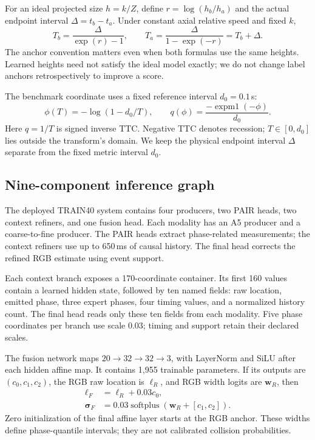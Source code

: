 \documentclass[twocolumn,letterpaper]{article}
\begin{document}
For an ideal projected size $h=k/Z$, define $r=\log(h_b/h_a)$ and the actual endpoint interval $\Delta=t_b-t_a$. Under constant axial relative speed and fixed $k$,
\begin{equation}
 T_b=\frac{\Delta}{\exp(r)-1},\qquad
 T_a=\frac{\Delta}{1-\exp(-r)}=T_b+\Delta.
\label{eq:anchors}
\end{equation}
The anchor convention matters even when both formulas use the same heights. Learned heights need not satisfy the ideal model exactly; we do not change label anchors retrospectively to improve a score.

The benchmark coordinate uses a fixed reference interval $d_0=0.1$\,s:
\begin{equation}
 \phi(T)=-\log(1-d_0/T),\qquad
 q(\phi)=\frac{-\operatorname{expm1}(-\phi)}{d_0}.
\label{eq:phase}
\end{equation}
Here $q=1/T$ is signed inverse TTC. Negative TTC denotes recession; $T\in[0,d_0]$ lies outside the transform's domain. We keep the physical endpoint interval $\Delta$ separate from the fixed metric interval $d_0$.

\subsection{Nine-component inference graph}
The deployed TRAIN40 system contains four producers, two PAIR heads, two context refiners, and one fusion head. Each modality has an A5 producer and a coarse-to-fine producer. The PAIR heads extract phase-related measurements; the context refiners use up to 650\,ms of causal history. The final head corrects the refined RGB estimate using event support.

Each context branch exposes a 170-coordinate container. Its first 160 values contain a learned hidden state, followed by ten named fields: raw location, emitted phase, three expert phases, four timing values, and a normalized history count. The final head reads only these ten fields from each modality. Five phase coordinates per branch use scale $0.03$; timing and support retain their declared scales.

The fusion network maps $20\!\rightarrow\!32\!\rightarrow\!32\!\rightarrow\!3$, with LayerNorm and SiLU after each hidden affine map. It contains 1,955 trainable parameters. If its outputs are $(c_0,c_1,c_2)$, the RGB raw location is $\ell_R$, and RGB width logits are $\mathbf w_R$, then
\begin{align}
 \ell_F&=\ell_R+0.03c_0,\\
 \boldsymbol\sigma_F&=0.03\operatorname{softplus}
       (\mathbf w_R+[c_1,c_2]).
\end{align}
Zero initialization of the final affine layer starts at the RGB anchor. These widths define phase-quantile intervals; they are not calibrated collision probabilities.
\end{document}
